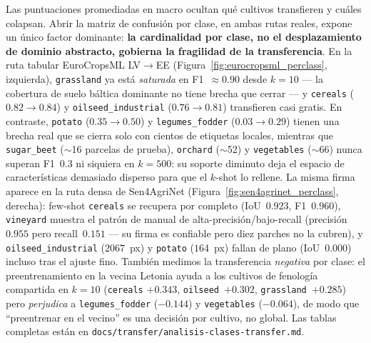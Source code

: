 Las puntuaciones promediadas en macro ocultan qué cultivos transfieren y
cuáles colapsan. Abrir la matriz de confusión por clase, en ambas rutas
reales, expone un único factor dominante:
\textbf{la cardinalidad por clase, no el desplazamiento de dominio
abstracto, gobierna la fragilidad de la transferencia}.
En la ruta tabular EuroCropsML LV$\rightarrow$EE
(Figura~\ref{fig:eurocropsml_perclass}, izquierda), \texttt{grassland} ya
está \emph{saturada} en F1~$\approx0.90$ desde $k{=}10$ --- la cobertura
de suelo báltica dominante no tiene brecha que cerrar --- y
\texttt{cereals} ($0.82\rightarrow0.84$) y
\texttt{oilseed\_industrial} ($0.76\rightarrow0.81$) transfieren casi
gratis. En contraste, \texttt{potato} ($0.35\rightarrow0.50$) y
\texttt{legumes\_fodder} ($0.03\rightarrow0.29$) tienen una brecha real
que se cierra solo con cientos de etiquetas locales, mientras que
\texttt{sugar\_beet} ($\sim$16 parcelas de prueba), \texttt{orchard}
($\sim$52) y \texttt{vegetables} ($\sim$66) nunca superan F1~$0.3$ ni
siquiera en $k{=}500$: su soporte diminuto deja el espacio de
características demasiado disperso para que el $k$-shot lo rellene. La
misma firma aparece en la ruta densa de Sen4AgriNet
(Figura~\ref{fig:sen4agrinet_perclass}, derecha): few-shot
\texttt{cereals} se recupera por completo (IoU~$0.923$, F1~$0.960$),
\texttt{vineyard} muestra el patrón de manual de
alta-precisión/bajo-recall (precisión~$0.955$ pero recall~$0.151$ --- su
firma es confiable pero diez parches no la cubren), y
\texttt{oilseed\_industrial} ($2067$~px) y
\texttt{potato} ($164$~px) fallan de plano (IoU~$0.000$) incluso tras el
ajuste fino. También medimos la transferencia \emph{negativa} por clase:
el preentrenamiento en la vecina Letonia ayuda a los cultivos de
fenología compartida en $k{=}10$ (\texttt{cereals} $+0.343$,
\texttt{oilseed}~$+0.302$, \texttt{grassland}~$+0.285$) pero
\emph{perjudica} a \texttt{legumes\_fodder} ($-0.144$) y
\texttt{vegetables} ($-0.064$), de modo que ``preentrenar en el vecino''
es una decisión por cultivo, no global. Las tablas completas están en
\texttt{docs/transfer/analisis-clases-transfer.md}.

